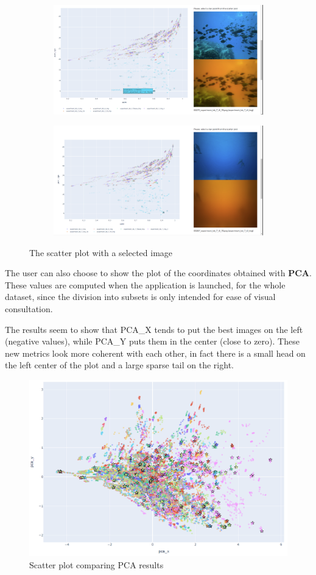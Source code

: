 \documentclass[12pt]{article}
\begin{document}
	\begin{figure}[h!]
	\begin{subfigure}[H!]{0.5\textwidth}
		\centering
		\includegraphics[width=0.9\linewidth]{imgs/scatter1}
		\label{fig:scatter1}
	\end{subfigure}
	\begin{subfigure}[H!]{0.5\textwidth}
		\centering
		\includegraphics[width=0.9\linewidth]{imgs/scatter2}
		\label{fig:scatter2}
	\end{subfigure}
	\caption{The scatter plot with a selected image}
	\label{fig:scatters}
	\end{figure}

	The user can also choose to show the plot of the coordinates obtained with \textbf{PCA}. These values are computed when the application is launched, for the whole dataset, since the division into subsets is only intended for ease of visual consultation.

	The results seem to show that PCA\_X tends to put the best images on the left (negative values), while PCA\_Y puts them in the center (close to zero). These new metrics look more coherent with each other, in fact there is a small head on the left center of the plot and a large sparse tail on the right.

	\begin{figure}[h!]
		\centering
		\includegraphics[width=0.6\linewidth]{imgs/scatter3}
		\caption{Scatter plot comparing PCA results}
		\label{fig:scatter3}
	\end{figure}
\end{document}
